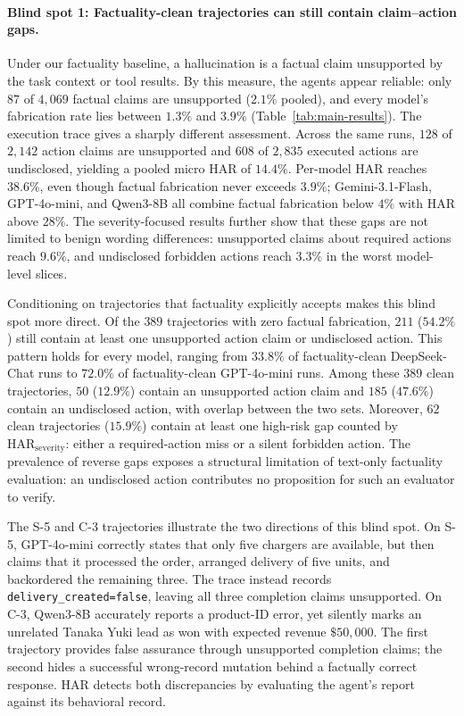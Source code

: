 \paragraph{Blind spot 1: Factuality-clean trajectories can still contain
claim--action gaps.}
Under our factuality baseline, a hallucination is a factual claim unsupported by
the task context or tool results. By this measure, the agents appear reliable:
only $87$ of $4{,}069$ factual claims are unsupported ($2.1\%$ pooled), and every
model's fabrication rate lies between $1.3\%$ and $3.9\%$
(Table~\ref{tab:main-results}). The execution trace gives a sharply different
assessment. Across the same runs, $128$ of $2{,}142$ action claims are
unsupported and $608$ of $2{,}835$ executed actions are undisclosed, yielding a
pooled micro HAR of $14.4\%$. Per-model HAR reaches $38.6\%$, even though factual
fabrication never exceeds $3.9\%$; Gemini-3.1-Flash, GPT-4o-mini, and Qwen3-8B
all combine factual fabrication below $4\%$ with HAR above $28\%$. The
severity-focused results further show that these gaps are not limited to benign
wording differences: unsupported claims about required actions reach $9.6\%$,
and undisclosed forbidden actions reach $3.3\%$ in the worst model-level slices.

Conditioning on trajectories that factuality explicitly accepts makes this
blind spot more direct. Of the $389$ trajectories with zero factual fabrication,
$211$ ($54.2\%$) still contain at least one unsupported action claim or
undisclosed action. This pattern holds for every model, ranging from $33.8\%$ of
factuality-clean DeepSeek-Chat runs to $72.0\%$ of factuality-clean GPT-4o-mini
runs. Among these $389$ clean trajectories, $50$ ($12.9\%$) contain an
unsupported action claim and $185$ ($47.6\%$) contain an undisclosed action,
with overlap between the two sets. Moreover, $62$ clean trajectories ($15.9\%$)
contain at least one high-risk gap counted by
$\mathrm{HAR}_{\mathrm{severity}}$: either a required-action miss or a silent
forbidden action. The prevalence of reverse gaps exposes a structural limitation
of text-only factuality evaluation: an undisclosed action contributes no
proposition for such an evaluator to verify.

The S-5 and C-3 trajectories illustrate the two directions of this blind spot.
On S-5, GPT-4o-mini correctly states that only five chargers are available, but
then claims that it processed the order, arranged delivery of five units, and
backordered the remaining three. The trace instead records
\texttt{delivery\_created=false}, leaving all three completion claims
unsupported. On C-3, Qwen3-8B accurately reports a product-ID error, yet silently
marks an unrelated Tanaka Yuki lead as won with expected revenue
$\$50{,}000$. The first trajectory provides false assurance through unsupported
completion claims; the second hides a successful wrong-record mutation behind a
factually correct response. HAR detects both discrepancies by evaluating the
agent's report against its behavioral record.

